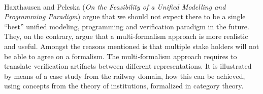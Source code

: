 

\ \hline \ %

Haxthausen and Peleska
\cite{isola-2016-haxthausen}
({\em On the Feasibility of a Unified Modelling and
Programming Paradigm})
argue that we should not expect there to be a single ``best'' 
unified modeling, programming and verification paradigm in the 
future. They, on the contrary, argue that a multi-formalism 
approach is more realistic and useful. Amongst the reasons 
mentioned is that multiple stake holders will not be able to agree 
on a formalism. The multi-formalism approach
requires to translate verification artifacts between different 
representations. It is illustrated
by means of a case study from the railway domain, how this can be
achieved, using concepts from the theory of institutions, formalized in category theory. 

\done{}

